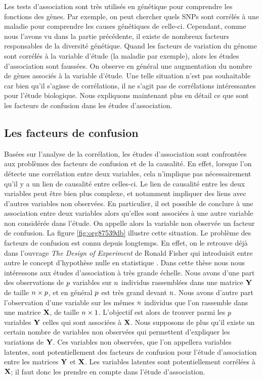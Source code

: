 \documentclass[12pt,a4paper,twoside]{ugathesis}
\begin{document}
Les tests d'association sont très utilisés en génétique pour comprendre les
fonctions des gènes. Par exemple, on peut chercher quels SNPs sont corrélés à
une maladie pour comprendre les causes génétiques de celle-ci. Cependant, comme
nous l'avons vu dans la partie précédente, il existe de nombreux facteurs
responsables de la diversité génétique. Quand les facteurs de variation du
génome sont corrélés à la variable d'étude (la maladie par exemple), alors les
études d'association sont faussées. On observe en général une augmentation du
nombre de gènes associés à la variable d'étude. Une telle situation n'est pas
souhaitable car bien qu'il s'agisse de corrélations, il ne s'agit pas de
corrélations intéressantes pour l'étude biologique. Nous expliquons maintenant
plus en détail ce que sont les facteurs de confusion dans les études
d'association.

\subsection{Les facteurs de confusion}
\label{sec:orgb0d6073}
\label{org2403af2}

Basées sur l'analyse de la corrélation, les études d'association sont
confrontées aux problèmes des facteurs de confusion et de la causalité. En
effet, lorsque l'on détecte une corrélation entre deux variables, cela
n'implique pas nécessairement qu'il y a un lien de causalité entre celles-ci. Le
lien de causalité entre les deux variables peut être bien plus complexe, et
notamment impliquer des liens avec d'autres variables non observées. En
particulier, il est possible de conclure à une association entre deux variables
alors qu'elles sont associées à une autre variable non considérée dans l'étude.
On appelle alors la variable non observée un facteur de confusion. La figure
\ref{fig:org87539db} illustre cette situation. Le problème des facteurs de
confusion est connu depuis longtemps. En effet, on le retrouve déjà dans
l'ouvrage \emph{The Design of Experiment} de Ronald Fisher qui introduisit entre
autre le concept d'hypothèse nulle en statistique \citep{fisher1937design}. Dans
cette thèse nous nous intéressons aux études d'association à très grande
échelle. Nous avons d'une part des observations de \(p\) variables sur \(n\)
individus rassemblées dans une matrice \(\mathbf{Y}\) de taille \(n \times p\), et
en général \(p\) est très grand devant \(n\). Nous avons d'autre part
l'observation d'une variable sur les mêmes \(n\) individus que l'on rassemble
dans une matrice \(\mathbf{X}\), de taille \(n \times 1\). L'objectif est alors de
trouver parmi les \(p\) variables \(\mathbf{Y}\) celles qui sont associées à \(\mathbf{X}\). Nous
supposons de plus qu'il existe un certain nombre de variables non observées qui
permettent d'expliquer les variations de \(\mathbf{Y}\). Ces variables non observées, que
l'on appellera variables latentes, sont potentiellement des facteurs de
confusion pour l'étude d'association entre les matrices \(\mathbf{Y}\) et \(\mathbf{X}\). Les
variables latentes sont potentiellement corrélées à \(\mathbf{X}\); il faut donc les
prendre en compte dans l'étude d'association.
\end{document}
